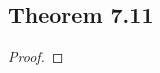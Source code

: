 \documentclass[../../main.tex]{subfiles}
\begin{document}
\subsection{Theorem 7.11}
\begin{wts}

\end{wts}
\begin{proof}

\end{proof}
\end{document}
